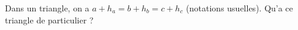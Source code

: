 Dans un triangle, on a $a + h_a = b + h_b = c + h_c$ (notations usuelles). Qu'a ce triangle de particulier ?
